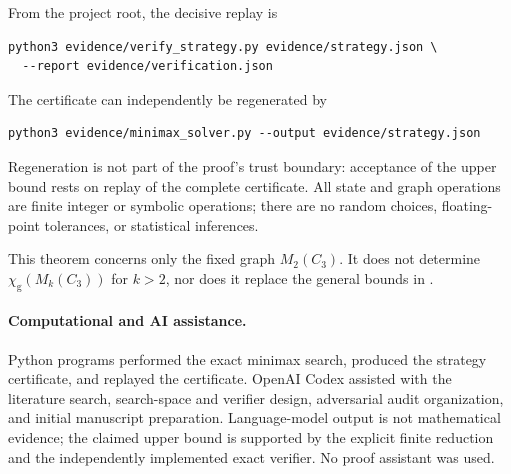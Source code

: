 \documentclass[11pt]{article}
\newcommand{\gamechi}{\chi_{\mathrm g}}
\begin{document}
From the project root, the decisive replay is
\begin{verbatim}
python3 evidence/verify_strategy.py evidence/strategy.json \
  --report evidence/verification.json
\end{verbatim}
The certificate can independently be regenerated by
\begin{verbatim}
python3 evidence/minimax_solver.py --output evidence/strategy.json
\end{verbatim}
Regeneration is not part of the proof's trust boundary: acceptance of the
upper bound rests on replay of the complete certificate.  All state and graph
operations are finite integer or symbolic operations; there are no random
choices, floating-point tolerances, or statistical inferences.

This theorem concerns only the fixed graph $M_2(C_3)$.  It does not determine
$\gamechi(M_k(C_3))$ for $k>2$, nor does it replace the general bounds in
\cite{MouSunZhang2026}.

\paragraph{Computational and AI assistance.}
Python programs performed the exact minimax search, produced the strategy
certificate, and replayed the certificate.  OpenAI Codex assisted with the
literature search, search-space and verifier design, adversarial audit
organization, and initial manuscript preparation.  Language-model output is
not mathematical evidence; the claimed upper bound is supported by the
explicit finite reduction and the independently implemented exact verifier.
No proof assistant was used.



\end{document}

